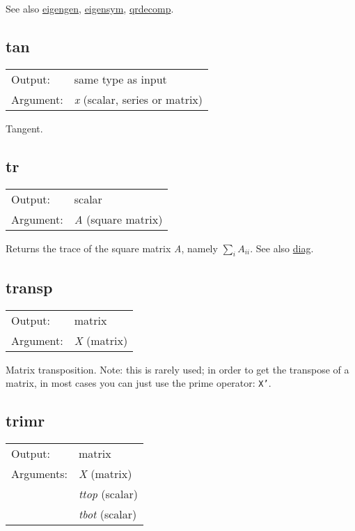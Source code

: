 	  See also \hyperlink{func-eigengen}{eigengen}, \hyperlink{func-eigensym}{eigensym}, \hyperlink{func-qrdecomp}{qrdecomp}.

\subsection{tan}
\hypertarget{func-tan}{}

\begin{tabular}{ll}
Output:     & same type as input\\
Argument:   & \textsl{x} (scalar, series or matrix)\\
\end{tabular}

	  Tangent.

\subsection{tr}
\hypertarget{func-tr}{}

\begin{tabular}{ll}
Output:     & scalar\\
Argument:   & \textsl{A} (square matrix)\\
\end{tabular}

	  Returns the trace of the square matrix \textsl{A},
	  namely $\sum_i A_{ii}$.
	  See also \hyperlink{func-diag}{diag}.

\subsection{transp}
\hypertarget{func-transp}{}

\begin{tabular}{ll}
Output:     & matrix\\
Argument:   & \textsl{X} (matrix)\\
\end{tabular}

	  Matrix transposition. Note: this is rarely used; in order to get
	  the transpose of a matrix, in most cases you can just use the
	  prime operator: \texttt{X'}.

\subsection{trimr}
\hypertarget{func-trimr}{}

\begin{tabular}{ll}
Output:     & matrix\\
Arguments:  & \textsl{X} (matrix)\\
           & \textsl{ttop} (scalar)\\
           & \textsl{tbot} (scalar)\\
\end{tabular}


